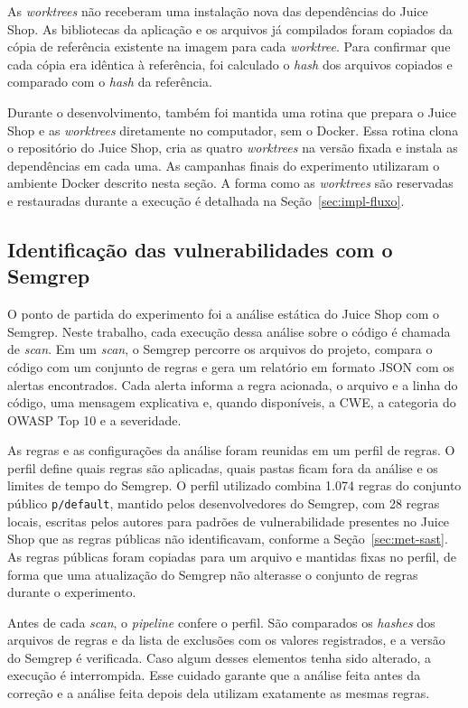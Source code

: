 As \textit{worktrees} não receberam uma instalação nova das dependências do Juice Shop. As bibliotecas da aplicação e os arquivos já compilados foram copiados da cópia de referência existente na imagem para cada \textit{worktree}. Para confirmar que cada cópia era idêntica à referência, foi calculado o \textit{hash} dos arquivos copiados e comparado com o \textit{hash} da referência.

Durante o desenvolvimento, também foi mantida uma rotina que prepara o Juice Shop e as \textit{worktrees} diretamente no computador, sem o Docker. Essa rotina clona o repositório do Juice Shop, cria as quatro \textit{worktrees} na versão fixada e instala as dependências em cada uma. As campanhas finais do experimento utilizaram o ambiente Docker descrito nesta seção. A forma como as \textit{worktrees} são reservadas e restauradas durante a execução é detalhada na Seção~\ref{sec:impl-fluxo}.

\subsection{Identificação das vulnerabilidades com o Semgrep}
\label{sec:impl-semgrep}

O ponto de partida do experimento foi a análise estática do Juice Shop com o Semgrep. Neste trabalho, cada execução dessa análise sobre o código é chamada de \textit{scan}. Em um \textit{scan}, o Semgrep percorre os arquivos do projeto, compara o código com um conjunto de regras e gera um relatório em formato JSON com os alertas encontrados. Cada alerta informa a regra acionada, o arquivo e a linha do código, uma mensagem explicativa e, quando disponíveis, a CWE, a categoria do OWASP Top 10 e a severidade.

As regras e as configurações da análise foram reunidas em um perfil de regras. O perfil define quais regras são aplicadas, quais pastas ficam fora da análise e os limites de tempo do Semgrep. O perfil utilizado combina 1.074 regras do conjunto público \texttt{p/default}, mantido pelos desenvolvedores do Semgrep, com 28 regras locais, escritas pelos autores para padrões de vulnerabilidade presentes no Juice Shop que as regras públicas não identificavam, conforme a Seção~\ref{sec:met-sast}. As regras públicas foram copiadas para um arquivo e mantidas fixas no perfil, de forma que uma atualização do Semgrep não alterasse o conjunto de regras durante o experimento.

Antes de cada \textit{scan}, o \textit{pipeline} confere o perfil. São comparados os \textit{hashes} dos arquivos de regras e da lista de exclusões com os valores registrados, e a versão do Semgrep é verificada. Caso algum desses elementos tenha sido alterado, a execução é interrompida. Esse cuidado garante que a análise feita antes da correção e a análise feita depois dela utilizam exatamente as mesmas regras.

